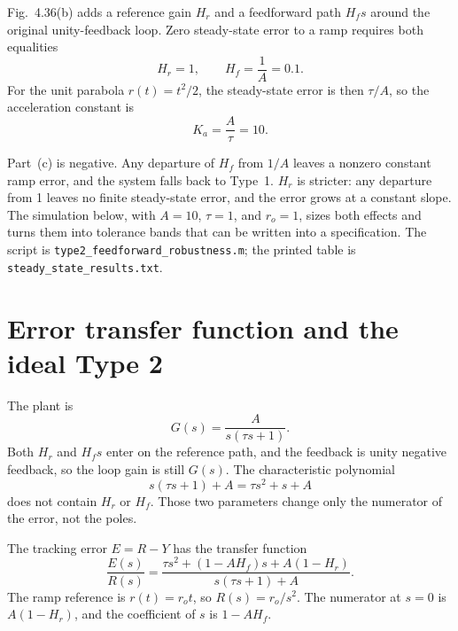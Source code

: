 \documentclass[12pt,a4paper]{article}
\begin{document}
Fig.~4.36(b) adds a reference gain \(H_r\) and a feedforward path \(H_f s\) around the original unity-feedback loop.
Zero steady-state error to a ramp requires both equalities
\begin{equation}
  H_r=1,\qquad H_f=\frac{1}{A}=0.1.
  \label{eq:ideal}
\end{equation}
For the unit parabola \(r(t)=t^2/2\), the steady-state error is then \(\tau/A\), so the acceleration constant is
\begin{equation}
  K_a=\frac{A}{\tau}=10.
  \label{eq:Ka}
\end{equation}

Part~(c) is negative. Any departure of \(H_f\) from \(1/A\) leaves a nonzero constant ramp error, and the system falls back to Type~1.
\(H_r\) is stricter: any departure from 1 leaves no finite steady-state error, and the error grows at a constant slope.
The simulation below, with \(A=10\), \(\tau=1\), and \(r_o=1\), sizes both effects and turns them into tolerance bands that can be written into a specification.
The script is \texttt{type2\_feedforward\_robustness.m}; the printed table is \texttt{steady\_state\_results.txt}.

\section{Error transfer function and the ideal Type 2}

The plant is
\[
  G(s)=\frac{A}{s(\tau s+1)}.
\]
Both \(H_r\) and \(H_f s\) enter on the reference path, and the feedback is unity negative feedback, so the loop gain is still \(G(s)\).
The characteristic polynomial
\begin{equation}
  s(\tau s+1)+A=\tau s^2+s+A
  \label{eq:char}
\end{equation}
does not contain \(H_r\) or \(H_f\). Those two parameters change only the numerator of the error, not the poles.

The tracking error \(E=R-Y\) has the transfer function
\begin{equation}
  \frac{E(s)}{R(s)}
  =\frac{\tau s^2+(1-A H_f)s+A(1-H_r)}{s(\tau s+1)+A}.
  \label{eq:EoverR}
\end{equation}
The ramp reference is \(r(t)=r_o t\), so \(R(s)=r_o/s^2\).
The numerator at \(s=0\) is \(A(1-H_r)\), and the coefficient of \(s\) is \(1-A H_f\).
\end{document}
